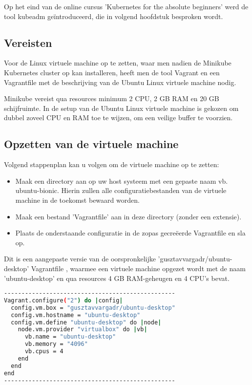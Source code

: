 Op het eind van de online cursus 'Kubernetes for the absolute beginners' werd de tool kubeadm geïntroduceerd, die in volgend hoofdstuk besproken wordt. 

\subsection{Vereisten}

Voor de Linux virtuele machine op te zetten, waar men nadien de Minikube Kubernetes cluster op kan installeren, heeft men de tool Vagrant en een Vagrantfile met de beschrijving van de Ubuntu Linux virtuele machine nodig. 

Minikube vereist qua resources minimum 2 CPU, 2 GB RAM en 20 GB schijfruimte. In de setup van de Ubuntu Linux virtuele machine is gekozen om dubbel zoveel CPU en RAM toe te wijzen, om een veilige buffer te voorzien.  

\subsection{Opzetten van de virtuele machine}

Volgend stappenplan kan u volgen om de virtuele machine op te zetten:
\begin{itemize}
    \item Maak een directory aan op uw host systeem met een gepaste naam vb. ubuntu-bionic. Hierin zullen alle configuratiebestanden van de virtuele machine in de toekomst bewaard worden.
    \item Maak een bestand 'Vagrantfile' aan in deze directory (zonder een extensie).
    \item Plaats de onderstaande configuratie in de zopas gecreëerde Vagrantfile en sla op.
\end{itemize}
 
Dit is een aangepaste versie van de oorspronkelijke 'gusztavvargadr/ubuntu-desktop' Vagrantfile \autocite{Varga2022}, waarmee een virtuele machine opgezet wordt met de naam 'ubuntu-desktop' en qua resources 4 GB RAM-geheugen en 4 CPU's bevat. 

\begin{lstlisting}[language=bash]
-------------------------------------------------
Vagrant.configure("2") do |config|
  config.vm.box = "gusztavvargadr/ubuntu-desktop"
  config.vm.hostname = "ubuntu-desktop"
  config.vm.define "ubuntu-desktop" do |node|
    node.vm.provider "virtualbox" do |vb|
      vb.name = "ubuntu-desktop"
      vb.memory = "4096"
      vb.cpus = 4
    end
  end
end
-------------------------------------------------
\end{lstlisting}

